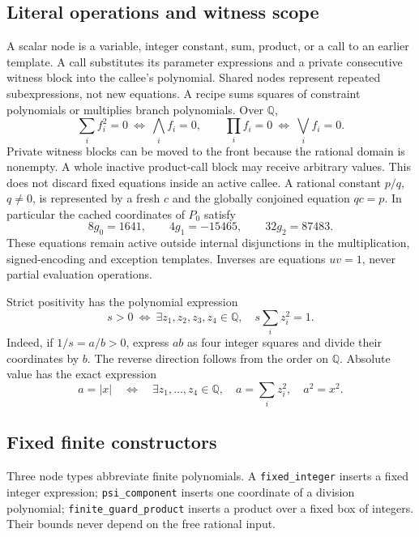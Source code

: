 \documentclass[11pt]{article}
\theoremstyle{definition}
\theoremstyle{remark}
\newcommand{\Q}{\mathbb Q}
\begin{document}
\subsection{Literal operations and witness scope}
A scalar node is a variable, integer constant, sum, product, or a call to
an earlier template. A call substitutes its parameter expressions and a
private consecutive witness block into the callee's polynomial. Shared
nodes represent repeated subexpressions, not new equations. A recipe
sums squares of constraint polynomials or multiplies branch polynomials.
Over $\Q$,
\[
 \sum_i f_i^2=0\ \Longleftrightarrow\ \bigwedge_i f_i=0,
 \qquad\prod_i f_i=0\ \Longleftrightarrow\ \bigvee_i f_i=0.
\]
Private witness blocks can be moved to the front because the rational
domain is nonempty. A whole inactive product-call block may receive
arbitrary values. This does not discard fixed equations inside an active
callee. A rational constant $p/q$, $q\ne0$, is represented by a fresh
$c$ and the globally conjoined equation $qc=p$. In particular the cached
coordinates of $P_0$ satisfy
\[
 8g_0=1641,\qquad4g_1=-15465,\qquad32g_2=87483.
\]
These equations remain active outside internal disjunctions in the
multiplication, signed-encoding and exception templates. Inverses are
equations $uv=1$, never partial evaluation operations.

Strict positivity has the polynomial expression
\[
 s>0\ \Longleftrightarrow\
 \exists z_1,z_2,z_3,z_4\in\Q,\quad s\sum_i z_i^2=1.
\]
Indeed, if $1/s=a/b>0$, express $ab$ as four integer squares and divide
their coordinates by $b$. The reverse direction follows from the order
on $\Q$. Absolute value has the exact expression
\[
 a=|x|\quad\Longleftrightarrow\quad
 \exists z_1,\ldots,z_4\in\Q,\quad a=\sum_i z_i^2,\quad a^2=x^2.
\]

\subsection{Fixed finite constructors}
Three node types abbreviate finite polynomials. A
\texttt{fixed\_integer} inserts a fixed integer expression;
\texttt{psi\_component} inserts one coordinate of a division polynomial;
\texttt{finite\_guard\_product} inserts a product over a fixed box of
integers. Their bounds never depend on the free rational input.
\end{document}
